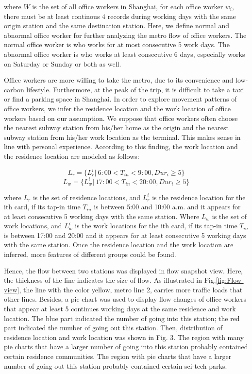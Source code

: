 \documentclass[journal]{IEEEtran}
\begin{document}
where $W$ is the set of all office workers in Shanghai, for each office worker $w_{i}$, there must be at least continous 4 records during working days with the same origin station and the same destination station.
Here, we define normal and abnormal office worker for further analyzing the metro flow of office workers. The normal office worker is who works for at most consecutive 5 work days. The abnormal office worker is who works at least consecutive 6 days, especially works on Saturday or Sunday or both as well. 

Office workers are more willing to take the metro, due to its convenience and low-carbon lifestyle. Furthermore, at the peak of the trip, it is difficult to take a taxi or find a parking space in Shanghai. In order to explore movement patterns of office workers, we infer the residence location and the work location of office workers based on our assumption. We suppose that office workers often choose the nearest subway station from his/her home as the origin and the nearest subway station from his/her work location as the terminal. This makes sense in line with personal experience. According to this finding, the work location and the residence location are modeled as follows:

\begin{equation}
L_{r}=\{L_{r}^i|\ 6:00< T_{in} < 9:00, Dur_{i}\ge5\}
\end{equation}
\begin{equation}
L_{w}=\{L_{w}^i|\ 17:00< T_{in} < 20:00, Dur_{i}\ge5\}
\end{equation}

where $L_{r}$ is the set of residence locations, and $L_{r}^i$ is the residence location for the ith card, if its tap-in time $T_{in}$ is between 5:00 and 10:00 a.m. and it appears for at least consecutive 5 working days with the same station. Where $L_{w}$ is the set of work locations, and $L_{w}^i$ is the work locations for the ith card, if its tap-in time $T_{in}$ is between 17:00 and 20:00 and it appears for at least consecutive 5 working days with the same station. Once the residence location and the work location are inferred, more features of different groups could be found.

Hence, the flow between two stations was displayed in flow snapshot view.  Here, the thickness of the line indicates the size of flow. As illustrated in Fig.\ref{fig:Flow-view}, the line with the color yellow, metro line 2, carries more traffic loads that other lines. Besides, a pie chart was used to display flow changes of office workers that appear at least 5 continues working days at the same residence and work location. The blue part indicated the number of going into this station; the red part indicated the number of going out this station. Then, distribution of residence location and work location was shown in Fig. 3. The region with many pie charts that have a larger number of going into this station probably contained certain residence communities. The region with pie charts that have a larger number of going out this station probably contained certain sci-tech parks. 
\end{document}
